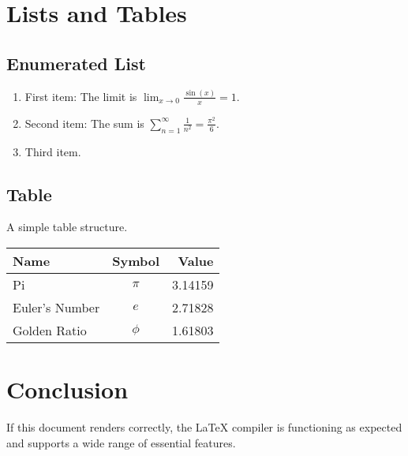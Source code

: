 \documentclass{article}
\begin{document}
\section{Lists and Tables}
\subsection{Enumerated List}
\begin{enumerate}
    \item First item: The limit is $\lim_{x \to 0} \frac{\sin(x)}{x} = 1$.
    \item Second item: The sum is $\sum_{n=1}^{\infty} \frac{1}{n^2} = \frac{\pi^2}{6}$.
    \item Third item.
\end{enumerate}

\subsection{Table}
A simple table structure.
\begin{center}
\begin{tabular}{|l|c|r|}
\hline
\textbf{Name} & \textbf{Symbol} & \textbf{Value} \\
\hline
Pi & $\pi$ & 3.14159 \\
Euler's Number & $e$ & 2.71828 \\
Golden Ratio & $\phi$ & 1.61803 \\
\hline
\end{tabular}
\end{center}

\section{Conclusion}
If this document renders correctly, the LaTeX compiler is functioning as expected and supports a wide range of essential features.
\end{document}
